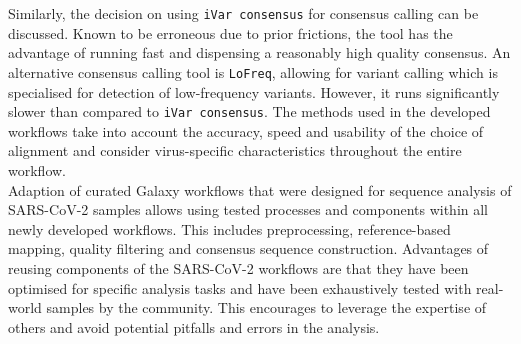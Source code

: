 Similarly, the decision on using \texttt{iVar consensus} for consensus calling can be discussed. Known to be erroneous due to prior frictions, the tool has the advantage of running fast and dispensing a reasonably high quality consensus. An alternative consensus calling tool is \texttt{LoFreq}, allowing for variant calling which is specialised for detection of low-frequency variants. However, it runs significantly slower than compared to \texttt{iVar consensus}. The methods used in the developed workflows take into account the accuracy, speed and usability of the choice of alignment and consider virus-specific characteristics throughout the entire workflow.\\
Adaption of curated Galaxy workflows that were designed for sequence analysis of \ac{SARS-CoV-2} samples allows using tested processes and components within all newly developed workflows. This includes preprocessing, reference-based mapping, quality filtering and consensus sequence construction. Advantages of reusing components of the \ac{SARS-CoV-2} workflows are that they have been optimised for specific analysis tasks and have been exhaustively tested with real-world samples by the community. This encourages to leverage the expertise of others and avoid potential pitfalls and errors in the analysis.

